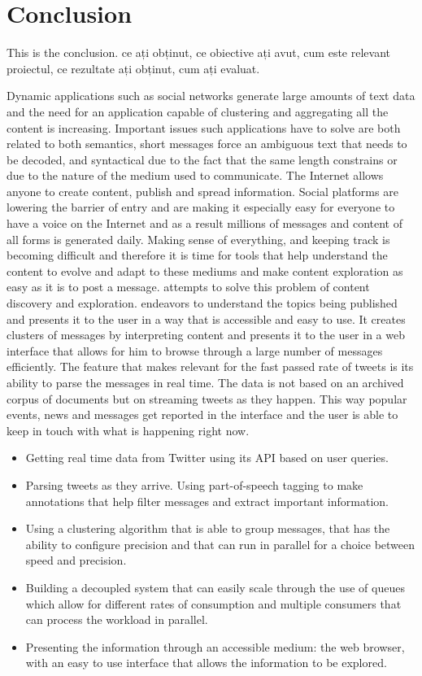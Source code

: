 \chapter{Conclusion}
\label{chapter:conclusion}

This is the conclusion.  ce ați obținut, ce obiective ați avut, cum este relevant proiectul, ce rezultate ați obținut, cum ați evaluat.

Dynamic applications such as social networks generate large amounts of text data and the need for an application capable of clustering and aggregating all the content is increasing. Important issues such applications have to solve are both related to both semantics, short messages force an ambiguous text that needs to be decoded, and syntactical due to the fact that the same length constrains or due to the nature of the medium used to communicate.  
The Internet allows anyone to create content, publish and spread information. Social platforms are lowering the barrier of entry and are making it especially easy for everyone to have a voice on the Internet and as a result millions of messages and content of all forms is generated daily. Making sense of everything, and keeping track is becoming difficult and therefore it is time for tools that help understand the content to evolve and adapt to these mediums and make content exploration as easy as it is to post a message.
\newline
{\project}  attempts to solve this problem of content discovery and exploration. {\project}  endeavors to understand the topics being published and presents it to the user in a way that is accessible and easy to use. It creates clusters of messages by interpreting content and presents it to the user in a web interface that allows for him to browse through a large number of messages efficiently.
\newline
The feature that makes {\project}  relevant for the fast passed rate of tweets is its ability to parse the messages in real time. The data is not based on an archived corpus of documents but on streaming tweets as they happen. This way popular events, news and messages get reported in the interface and the user is able to keep in touch with what is happening right now.
\newline
\begin{itemize}
	\item Getting real time data from Twitter using its API based on user queries.
	\item Parsing tweets as they arrive. Using part-of-speech tagging to make annotations that help filter messages and extract important information.
	\item Using a clustering algorithm that is able to group messages, that has the ability to configure precision and that can run in parallel for a choice between speed and precision. 
	\item Building a decoupled system that can easily scale through the use of queues which allow for different rates of consumption and multiple consumers that can process the workload in parallel.
	\item Presenting the information through an accessible medium: the web browser, with an easy to use interface that allows the information to be explored.
\end{itemize}
